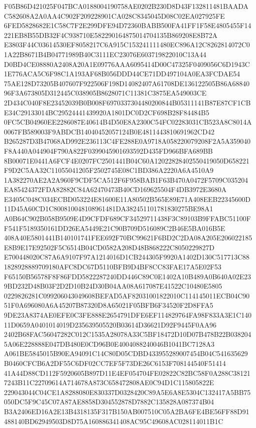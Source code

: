 \documentclass[UTF8,fontset=fandol,zihao=-4,a4paper]{ctexart}
\begin{document}
{{F05B86D421025F047BCA0188004190758AE0202B230D8D43F132811481BAADAC582608A2A0AA4C902F209228901CA028C8345045D08C02EA027925FE
6FED5828682E1C58C7F2E299DFE94D72360BABB500FA41FF1F58E4805455F14221EB8B55DB32F4C938710E582290164875014704135B869208E8B72A
E3803F44C03614530EF8058217C6A915C153241111480EC896A12C8262814072C01A22B8671B4B04771989B40C3111EC23076E603719822010C13A44
D0BD4CE08880A2408A20A1E09776AAA6095414D00C47325F0409056C6D1943C1E776ACA5C6F98C1A193AF68B056DDD44CE71DD497104A0EA3FCDAE54
75AE128D73205B407607F922506F198D14082407A61708DE136122505B86A6884096F3A673805D312445C038905B8628071C11381C3875EA549003CE
2D434C040F8E23452039B0B008F6970337304480200844B05311141B87E87CF1CBE34C29133014BC29524441439920A1801DC0D2CF698B28F84484B5
0FC5CB04960EE2286087E40614B4D50E8A2300C54FC02283031CB523A8C8014A0067FB589003F9ABDCB14040452057124B0E4811443810691962CD42
B265287D3B47068AD992E236113C4FE288E0A9718A058220079208F2A5A359040F8A440A044904F790A822F0399045901693592D435FD966BFA689BB
8B00071E0441A6FCF4E0207FC2501441B04C60A12022828402550419050D658221F9D2C5AA32C11055041205F2502745E08C1BD386A2220A6A4510A9
1A382270AE2A2A960F9CDF5CA512F6F958BAB1F63B470A0472F5709C035204EA85424372FDA82882C84A62470473B40CD169625504F4DB3972E3680A
E3405C048C034ECBD053224E81600E11A80502B565E89E71A408EEB22345600D11D45A60CD1C800810048108961481DA382451101781830275BE98A1
A0B64C902B058B9509E4D9CFDF689CF34529711438F3C89103B9FFABC51100FF541F5189350161DD26EA5449E21C90B709D516089C2B46E5BA016B5E
408A40E5801441B140101741FEE692F70BC99621F6BD2C2DA08A205E206022185E8B9E17E92502F5C6514B04CD0582A208D48B868222C8050229827D
E700448020C87A6A9107F97A1214016D1CB244305F9920A1402D130C517713C881828928889709180AFC8DC67D5110BFB9D4BF8CC83FAE17A5E02F53
F65150B56578F8F86FDD5822287240DD446C89C0E1402A10B489A0B640A02E239BD232D48B03F2D2D10B24D30B04AA08A617087E41522C10480E5805
0229826281C099206043049608BEFAD5AF82031001822010C114145011ECB04C9051F0A696080A6A45207B87320D8A65021F05BFB6F34520F2D8FFA5
9DE23A8374AE0EFE0C3FE888E2654791DFE6EF114829764FA98F833A3E1C14011D0659A0401014019D235639505520B03614D36621D92F9445F0AA96
2402B68FAC56047282C012C1535A28078A33C5BF18472D10D07B478B22B0382045A06E228888E047DB480E0CD96B0E4004088240046B1041BC7128A3
A061BE5845015B90EA94091C14C80D05CDBD433955289007454B04C541635629B0460CFCB6A2DF55C6DF02CC7EF5F73DE26C6153F708144540F51414
41A44D88CD112F5920605B897D11E4EF054704FE02822C82BC58F0A288C381217243B11C22709614A714678A873C658472808AE0C94D1C115805822E
229043044C04CE1A8288080E830337D0328420C89A5E6A8E5304C132417A5BB75050DC5F9C45C07A87AE8858D304552878D7882C135828A087374B04
B3A2406ED16A2E13B4318135F317B150AB007510C05A2BA6FE4BE56FF88D91488140BD62949503D8D75A160886341408AC95C49608AC028114011B1C
}}
\end{document}
